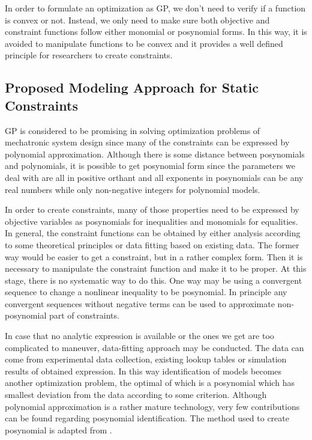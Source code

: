 In order to formulate an optimization as GP, we don't need to verify if a function is convex or not. Instead, we only need to make sure both objective and constraint functions follow either monomial or posynomial forms. In this way, it is avoided to manipulate functions to be convex and it provides a well defined principle for researchers to create constraints.

\subsection{Proposed Modeling Approach for Static Constraints}
GP is considered to be promising in solving optimization problems of mechatronic system design since many of the constraints can be expressed by polynomial approximation. Although there is some distance between posynomials and polynomials, it is possible to get posynomial form since the parameters we deal with are all in positive orthant and all exponents in posynomials can be any real numbers while only non-negative integers for polynomial models. 

In order to create constraints, many of those properties need to be expressed by objective variables as posynomials for inequalities and monomials for equalities. In general, the constraint functions can be obtained by either analysis according to some theoretical principles or data fitting based on existing data. The former way would be easier to get a constraint, but in a rather complex form. Then it is necessary to manipulate the constraint function and make it to be proper. At this stage, there is no systematic way to do this. One way may be using a convergent sequence to change a nonlinear inequality to be posynomial. In principle any convergent sequences without negative terms can be used to approximate non-posynomial part of constraints. 
 
In case that no analytic expression is available or the ones we get are too complicated to maneuver, data-fitting approach may be conducted. The data can come from experimental data collection, existing lookup tables or simulation results of obtained expression. In this way identification of models becomes another optimization problem, the optimal of which is a posynomial which has smallest deviation from the data according to some criterion. Although polynomial approximation is a rather mature technology, very few contributions can be found regarding posynomial identification. The method used to create posynomial is adapted from \cite{Posynomial2015}. 

